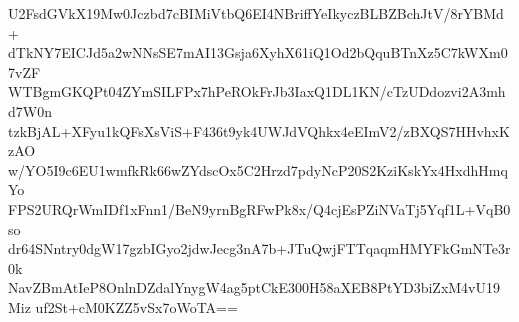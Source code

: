 U2FsdGVkX19Mw0Jczbd7cBIMiVtbQ6EI4NBriffYeIkyczBLBZBchJtV/8rYBMd+
dTkNY7EICJd5a2wNNsSE7mAI13Gsja6XyhX61iQ1Od2bQquBTnXz5C7kWXm07vZF
WTBgmGKQPt04ZYmSILFPx7hPeROkFrJb3IaxQ1DL1KN/cTzUDdozvi2A3mhd7W0n
tzkBjAL+XFyu1kQFsXsViS+F436t9yk4UWJdVQhkx4eEImV2/zBXQS7HHvhxKzAO
w/YO5I9c6EU1wmfkRk66wZYdscOx5C2Hrzd7pdyNcP20S2KziKskYx4HxdhHmqYo
FPS2URQrWmIDf1xFnn1/BeN9yrnBgRFwPk8x/Q4cjEsPZiNVaTj5Yqf1L+VqB0so
dr64SNntry0dgW17gzbIGyo2jdwJecg3nA7b+JTuQwjFTTqaqmHMYFkGmNTe3r0k
NavZBmAtIeP8OnlnDZdalYnygW4ag5ptCkE300H58aXEB8PtYD3biZxM4vU19Miz
uf2St+cM0KZZ5vSx7oWoTA==

